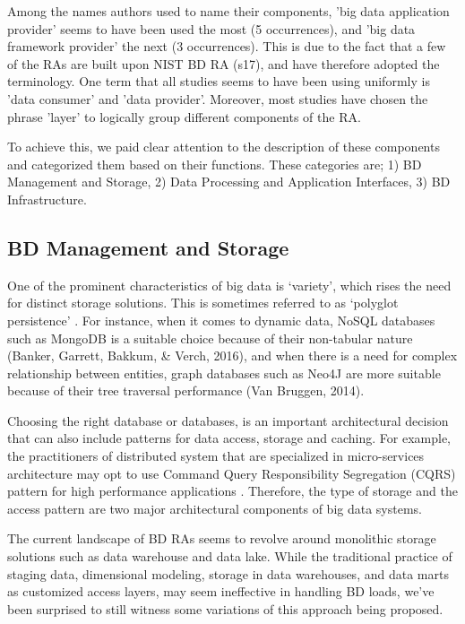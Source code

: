 \documentclass[review]{elsarticle}
\begin{document}
Among the names authors used to name their components, 'big data application provider' seems to have been used the most (5 occurrences), and 'big data framework provider' the next (3 occurrences). This is due to the fact  that a few of the RAs are built upon NIST BD RA (s17), and have therefore adopted the terminology. One term that all studies seems to have been using uniformly is 'data consumer' and 'data provider'. Moreover, most studies have chosen the phrase 'layer' to logically group different components of the RA.

To achieve this, we paid clear attention to the description of these components and categorized them based on their functions. These categories are; 1) BD Management and Storage, 2) Data Processing and Application Interfaces, 3) BD Infrastructure.

\subsection{BD Management and Storage}

One of the prominent characteristics of big data is ‘variety’, which rises the need for distinct storage solutions. This is sometimes referred to as ‘polyglot persistence’ \cite{khine2019review}. For instance, when it comes to dynamic data, NoSQL databases such as MongoDB is a suitable choice because of their non-tabular nature (Banker, Garrett, Bakkum, \& Verch, 2016), and when there is a need for complex relationship between entities, graph databases such as Neo4J are more suitable because of their tree traversal performance (Van Bruggen, 2014). 

Choosing the right database or databases, is an important architectural decision that can also include patterns for data access, storage and caching. For example, the practitioners of distributed system that are specialized in micro-services architecture may opt to use Command Query Responsibility Segregation (CQRS) pattern for high performance applications \cite{marquez2018actual}. Therefore, the type of storage and the access pattern are two major architectural components of big data systems. 

The current landscape of BD RAs seems to revolve around monolithic storage solutions such as data warehouse and data lake. While the traditional practice of staging data, dimensional modeling, storage in data warehouses, and data marts as customized access layers, may seem ineffective in handling BD loads, we've been surprised to still witness some variations of this approach being proposed.  
\end{document}
